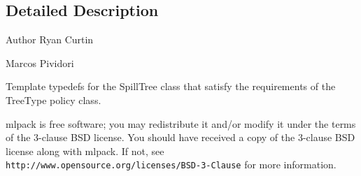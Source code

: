 \subsection{Detailed Description}
\begin{DoxyAuthor}{Author}
Ryan Curtin 

Marcos Pividori
\end{DoxyAuthor}
Template typedefs for the Spill\+Tree class that satisfy the requirements of the Tree\+Type policy class.

mlpack is free software; you may redistribute it and/or modify it under the terms of the 3-\/clause B\+SD license. You should have received a copy of the 3-\/clause B\+SD license along with mlpack. If not, see {\tt http\+://www.\+opensource.\+org/licenses/\+B\+S\+D-\/3-\/\+Clause} for more information. 